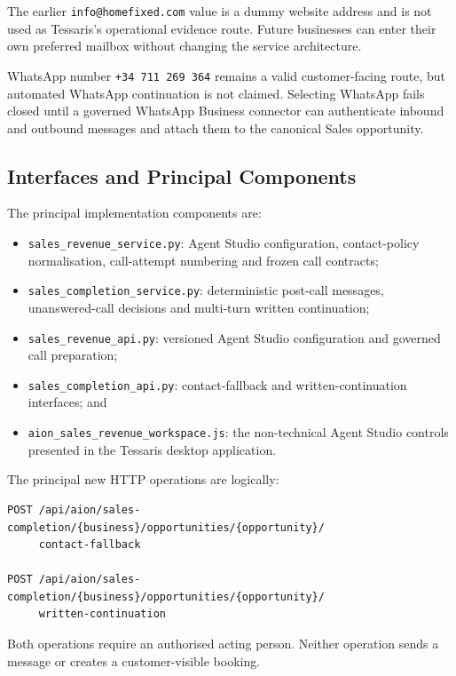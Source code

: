The earlier \texttt{info@homefixed.com} value is a dummy website address and is
not used as Tessaris's operational evidence route.  Future businesses can enter
their own preferred mailbox without changing the service architecture.

WhatsApp number \texttt{+34 711 269 364} remains a valid customer-facing route,
but automated WhatsApp continuation is not claimed.  Selecting WhatsApp fails
closed until a governed WhatsApp Business connector can authenticate inbound
and outbound messages and attach them to the canonical Sales opportunity.

\subsection{Interfaces and Principal Components}

The principal implementation components are:

\begin{itemize}[leftmargin=*]
  \item \texttt{sales\_revenue\_service.py}: Agent Studio configuration,
        contact-policy normalisation, call-attempt numbering and frozen call contracts;
  \item \texttt{sales\_completion\_service.py}: deterministic post-call messages,
        unanswered-call decisions and multi-turn written continuation;
  \item \texttt{sales\_revenue\_api.py}: versioned Agent Studio configuration and
        governed call preparation;
  \item \texttt{sales\_completion\_api.py}: contact-fallback and written-continuation
        interfaces; and
  \item \texttt{aion\_sales\_revenue\_workspace.js}: the non-technical Agent Studio
        controls presented in the Tessaris desktop application.
\end{itemize}

The principal new HTTP operations are logically:

\begin{verbatim}
POST /api/aion/sales-completion/{business}/opportunities/{opportunity}/
     contact-fallback

POST /api/aion/sales-completion/{business}/opportunities/{opportunity}/
     written-continuation
\end{verbatim}

Both operations require an authorised acting person.  Neither operation sends a
message or creates a customer-visible booking.

